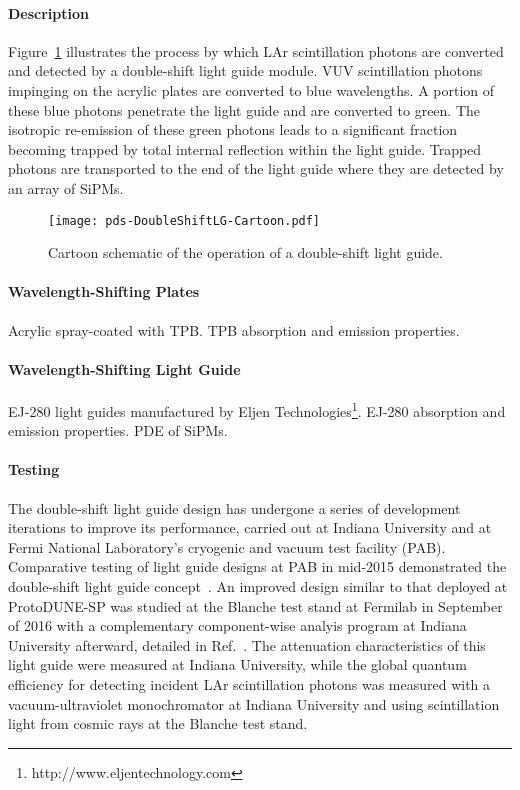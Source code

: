 \paragraph*{Description}

Figure~\ref{fig:DoubleShiftLG-Cartoon} illustrates the process by which LAr scintillation 
photons are converted and detected by a double-shift light guide module. VUV scintillation
 photons impinging on the acrylic plates are converted to blue wavelengths. A portion of
 these blue photons penetrate the light guide and are converted to green. The isotropic 
re-emission of these green photons leads to a significant fraction becoming trapped by 
total internal reflection within the light guide. Trapped photons are transported to 
the end of the light guide where they are detected by an array of SiPMs.

\begin{figure}[ht]
  \begin{center}
  \texttt{[image: pds-DoubleShiftLG-Cartoon.pdf]}
  \caption{Cartoon schematic of the operation of a double-shift light guide.}\label{fig:DoubleShiftLG-Cartoon}
  \end{center}
\end{figure}

\paragraph*{Wavelength-Shifting Plates}

Acrylic spray-coated with TPB. TPB absorption and emission properties.

\paragraph*{Wavelength-Shifting Light Guide}

EJ-280 light guides manufactured by Eljen Technologies\footnote{http://www.eljentechnology.com}. 
EJ-280 absorption and emission properties. PDE of SiPMs.

\paragraph*{Testing}

The double-shift light guide design has undergone a series of development 
iterations to improve its performance, carried out at Indiana University and at 
Fermi National Laboratory's cryogenic and vacuum test facility (PAB). 
Comparative testing of light guide designs at PAB in mid-2015 demonstrated 
the double-shift light guide concept~\cite{bib:JINST-11-C05019}.
 An improved design similar to that deployed at ProtoDUNE-SP was studied at 
the Blanche test stand at Fermilab in September of 2016 with a complementary 
component-wise analyis program at Indiana University afterward, detailed in 
Ref.~\cite{bib:DoubleShiftLG-NIM-171113}. The attenuation characteristics of 
this light guide were measured at Indiana University, while the global quantum 
efficiency for detecting incident LAr scintillation photons was measured with 
a vacuum-ultraviolet monochromator at Indiana University and using 
scintillation light from cosmic rays at the Blanche test stand.

